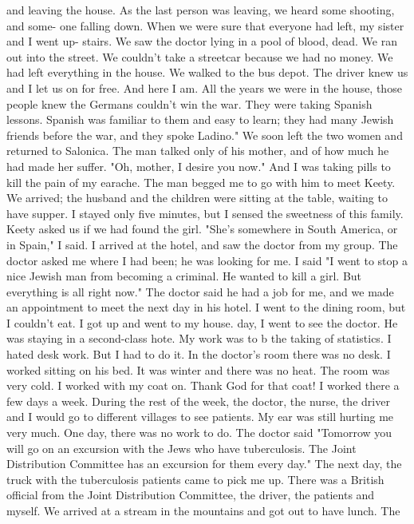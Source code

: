 and leaving the house. As the last person was leaving, we heard some shooting, and some-
one falling down. When we were sure that everyone had left, my sister and I went up-
stairs. We saw the doctor lying in a pool of blood, dead. 
We ran out into the street. We couldn't take a streetcar because we had no money. 
We had left everything in the house. We walked to the bus depot. The driver knew us and I 
let us on for free. And here I am. 
All the years we were in the house, those people knew the Germans couldn't win the 
war. They were taking Spanish lessons. Spanish was familiar to them and easy to learn; 
they had many Jewish friends before the war, and they spoke Ladino." 
We soon left the two women and returned to Salonica. The man talked only of his 
mother, and of how much he had made her suffer. "Oh, mother, I desire you now." And I 
was taking pills to kill the pain of my earache. The man begged me to go with him to 
meet Keety. We arrived; the husband and the children were sitting at the table, waiting to have supper. I stayed only five minutes, but I sensed the sweetness of this family.
Keety asked us if we had found the girl. 
"She's somewhere in South America, or in Spain," I said. 
I arrived at the hotel, and saw the doctor from my group. The doctor asked me 
where I had been; he was looking for me. I said "I went to stop a nice Jewish man from 
becoming a criminal. He wanted to kill a girl. But everything is all right now." The 
doctor said he had a job for me, and we made an appointment to meet the next day in his 
hotel. I went to the dining room, but I couldn't eat. I got up and went to my house. 
day, I went to see the doctor. He was staying in a second-class hote. My work was to b the taking of statistics. I hated desk work. But I had to do it. 
In the doctor's room there was no desk. I worked sitting on his bed. It was winter and 
there was no heat. The room was very cold. I worked with my coat on. Thank God for 
that coat!
I worked there a few days a week. During the rest of the week, the doctor, the 
nurse, the driver and I would go to different villages to see patients. My ear was still 
hurting me very much. One day, there was no work to do. The doctor 
said "Tomorrow you will go on an excursion with the Jews who have tuberculosis. The 
Joint Distribution Committee has an excursion for them every day." 
The next day, the truck with the tuberculosis patients came to pick me up. There 
was a British official from the Joint Distribution Committee, the driver, the patients 
and myself. We arrived at a stream in the mountains and got out to have lunch. The 
